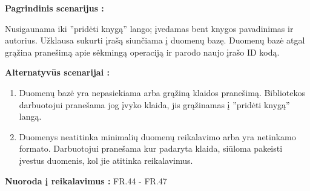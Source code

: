 \documentclass{VUMIFPSkursinis}
\begin{document}

	\textbf{Pagrindinis scenarijus :} 
    
    Nusigaunama iki ”pridėti knygą” lango; įvedamas bent knygos pavadinimas ir autorius.  Užklausa sukurti įrašą siunčiama į duomenų bazę. Duomenų bazė atgal grąžina pranešimą apie sėkmingą operaciją ir parodo naujo įrašo ID kodą.	
    
    \textbf{Alternatyvūs scenarijai :} 
	\begin{enumerate}
	\item Duomenų bazė yra nepasiekiama arba grąžiną klaidos pranešimą. Bibliotekos darbuotojui pranešama jog įvyko klaida, jis grąžinamas į ”pridėti knygą” langą. 
    
    \item Duomenys neatitinka minimalių duomenų reikalavimo arba yra netinkamo formato. Darbuotojui pranešama kur padaryta klaida, siūloma pakeisti įvestus duomenis, kol jie atitinka reikalavimus.
    \end{enumerate}
    
      \textbf {Nuoroda į reikalavimus :} FR.44 - FR.47
\end{document}
